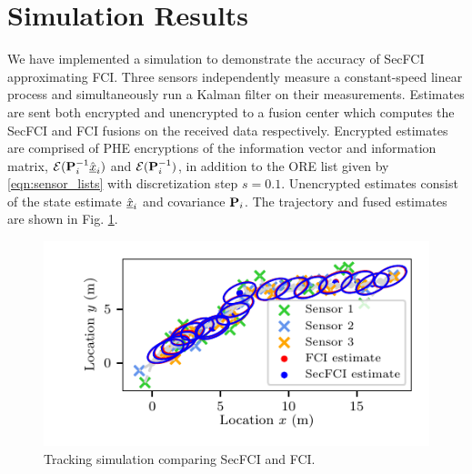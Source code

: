 \documentclass[letterpaper, 10 pt, conference]{ieeeconf}  %
\begin{document}



\section{Simulation Results} \label{sec:results}
We have implemented a simulation to demonstrate the accuracy of SecFCI approximating FCI. Three sensors independently measure a constant-speed linear process and simultaneously run a Kalman filter on their measurements. Estimates are sent both encrypted and unencrypted to a fusion center which computes the SecFCI and FCI fusions on the received data respectively. Encrypted estimates are comprised of PHE encryptions of the information vector and information matrix, $\mathcal{E}({{\mathbf{P}}}^{-1}_i\hat{{\underline{x}}}_i)$ and $\mathcal{E}({{\mathbf{P}}}^{-1}_i)$, in addition to the ORE list given by \eqref{eqn:sensor_lists} with discretization step $s=0.1$. Unencrypted estimates consist of the state estimate $\hat{{\underline{x}}}_i$ and covariance ${{\mathbf{P}}}_i$. The trajectory and fused estimates are shown in Fig. \ref{fig:fci_secfci_traj}.
\begin{figure}[tb]
   \vspace{-10pt}
   \begin{center}
      \includegraphics{images/fci_secfci_cmp.pdf}
   \end{center}
   \vspace{-15pt}
   \caption{Tracking simulation comparing SecFCI and FCI.}
   \vspace{-\baselineskip}
   \label{fig:fci_secfci_traj}
\end{figure}
\end{document}
